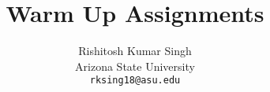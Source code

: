 \documentclass[10pt,twocolumn,letterpaper]{article}
\title{Warm Up Assignments}
\author{Rishitosh Kumar Singh\\
Arizona State University\\
{\tt\small rksing18@asu.edu}
}
\begin{document}
\maketitle



    
    






{
    \small
    
    
}

% 
\end{document}
